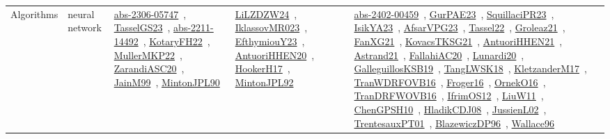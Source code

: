 {\begin{longtable}{lp{3cm}>{\raggedright\arraybackslash}p{6cm}>{\raggedright\arraybackslash}p{6cm}>{\raggedright\arraybackslash}p{8cm}}
\index{neural network}\index{Algorithms!neural network}Algorithms & neural network & \href{../works/abs-2306-05747.pdf}{abs-2306-05747}~\cite{abs-2306-05747}, \href{../works/TasselGS23.pdf}{TasselGS23}~\cite{TasselGS23}, \href{../works/abs-2211-14492.pdf}{abs-2211-14492}~\cite{abs-2211-14492}, \href{../works/KotaryFH22.pdf}{KotaryFH22}~\cite{KotaryFH22}, \href{../works/MullerMKP22.pdf}{MullerMKP22}~\cite{MullerMKP22}, \href{../works/ZarandiASC20.pdf}{ZarandiASC20}~\cite{ZarandiASC20}, \href{../works/JainM99.pdf}{JainM99}~\cite{JainM99}, \href{../works/MintonJPL90.pdf}{MintonJPL90}~\cite{MintonJPL90} & \href{../works/LiLZDZW24.pdf}{LiLZDZW24}~\cite{LiLZDZW24}, \href{../works/IklassovMR023.pdf}{IklassovMR023}~\cite{IklassovMR023}, \href{../works/EfthymiouY23.pdf}{EfthymiouY23}~\cite{EfthymiouY23}, \href{../works/AntuoriHHEN20.pdf}{AntuoriHHEN20}~\cite{AntuoriHHEN20}, \href{../works/HookerH17.pdf}{HookerH17}~\cite{HookerH17}, \href{../works/MintonJPL92.pdf}{MintonJPL92}~\cite{MintonJPL92} & \href{../works/abs-2402-00459.pdf}{abs-2402-00459}~\cite{abs-2402-00459}, \href{../works/GurPAE23.pdf}{GurPAE23}~\cite{GurPAE23}, \href{../works/SquillaciPR23.pdf}{SquillaciPR23}~\cite{SquillaciPR23}, \href{../works/IsikYA23.pdf}{IsikYA23}~\cite{IsikYA23}, \href{../works/AfsarVPG23.pdf}{AfsarVPG23}~\cite{AfsarVPG23}, \href{../works/Tassel22.pdf}{Tassel22}~\cite{Tassel22}, \href{../works/Groleaz21.pdf}{Groleaz21}~\cite{Groleaz21}, \href{../works/FanXG21.pdf}{FanXG21}~\cite{FanXG21}, \href{../works/KovacsTKSG21.pdf}{KovacsTKSG21}~\cite{KovacsTKSG21}, \href{../works/AntuoriHHEN21.pdf}{AntuoriHHEN21}~\cite{AntuoriHHEN21}, \href{../works/Astrand21.pdf}{Astrand21}~\cite{Astrand21}, \href{../works/FallahiAC20.pdf}{FallahiAC20}~\cite{FallahiAC20}, \href{../works/Lunardi20.pdf}{Lunardi20}~\cite{Lunardi20}, \href{../works/GalleguillosKSB19.pdf}{GalleguillosKSB19}~\cite{GalleguillosKSB19}, \href{../works/TangLWSK18.pdf}{TangLWSK18}~\cite{TangLWSK18}, \href{../works/KletzanderM17.pdf}{KletzanderM17}~\cite{KletzanderM17}, \href{../works/TranWDRFOVB16.pdf}{TranWDRFOVB16}~\cite{TranWDRFOVB16}, \href{../works/Froger16.pdf}{Froger16}~\cite{Froger16}, \href{../works/OrnekO16.pdf}{OrnekO16}~\cite{OrnekO16}, \href{../works/TranDRFWOVB16.pdf}{TranDRFWOVB16}~\cite{TranDRFWOVB16}, \href{../works/IfrimOS12.pdf}{IfrimOS12}~\cite{IfrimOS12}, \href{../works/LiuW11.pdf}{LiuW11}~\cite{LiuW11}, \href{../works/ChenGPSH10.pdf}{ChenGPSH10}~\cite{ChenGPSH10}, \href{../works/HladikCDJ08.pdf}{HladikCDJ08}~\cite{HladikCDJ08}, \href{../works/JussienL02.pdf}{JussienL02}~\cite{JussienL02}, \href{../works/TrentesauxPT01.pdf}{TrentesauxPT01}~\cite{TrentesauxPT01}, \href{../works/BlazewiczDP96.pdf}{BlazewiczDP96}~\cite{BlazewiczDP96}, \href{../works/Wallace96.pdf}{Wallace96}~\cite{Wallace96}\\

\end{longtable}}
